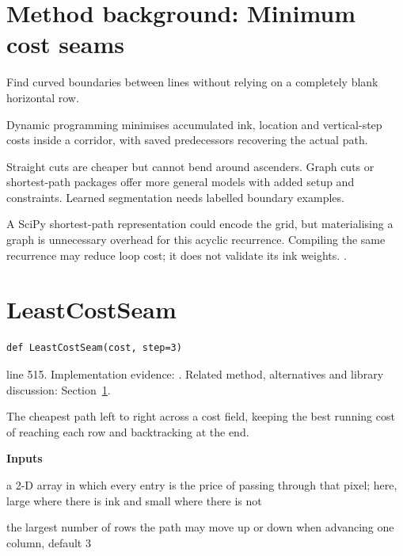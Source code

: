 \section{Method background: Minimum cost seams}\label{method:seam}
Find curved boundaries between lines without relying on a completely blank horizontal row.


Dynamic programming minimises accumulated ink, location and vertical-step costs inside a corridor, with saved predecessors recovering the actual path.


Straight cuts are cheaper but cannot bend around ascenders. Graph cuts or shortest-path packages offer more general models with added setup and constraints. Learned segmentation needs labelled boundary examples.


A SciPy shortest-path representation could encode the grid, but materialising a graph is unnecessary overhead for this acyclic recurrence. Compiling the same recurrence may reduce loop cost; it does not validate its ink weights. \cite{bellman1954,arvanitopoulos2014,avidan2007}.


\section{LeastCostSeam}\label{fn:segment:LeastCostSeam}
\begin{lstlisting}[style=sig]
def LeastCostSeam(cost, step=3)
\end{lstlisting}
 line 515. Implementation evidence: \cite{code2026}. Related method, alternatives and library discussion: Section~\ref{method:seam}.


The cheapest path left to right across a cost field, keeping the best running cost of reaching each row and backtracking at the end.




\noindent\textbf{Inputs}
\begin{description}[leftmargin=2.2em,style=nextline,font=\normalfont\ttfamily]\setlength\itemsep{1pt}
  \item[{cost}] \normalfont a 2-D array in which every entry is the price of passing through that pixel; here, large where there is ink and small where there is not
  \item[{step}] \normalfont the largest number of rows the path may move up or down when advancing one column, default 3
\end{description}

